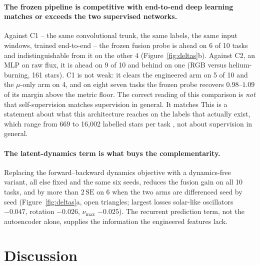 \documentclass{article}
\providecommand{\DIFaddtex}[1]{{\protect\color{blue} \sf #1}} %
\providecommand{\DIFdeltex}[1]{{\protect\color{red} \scriptsize #1}} %
\providecommand{\DIFaddbegin}{} %
\providecommand{\DIFaddend}{} %
\providecommand{\DIFdelbegin}{} %
\providecommand{\DIFdelend}{} %
\providecommand{\DIFadd}[1]{\texorpdfstring{\DIFaddtex{#1}}{#1}} %
\providecommand{\DIFdel}[1]{\texorpdfstring{\DIFdeltex{#1}}{}} %
\providecommand{\DIFscaledelfig}{0.5}
\newlength{\DIFdelgraphicswidth} %
\newlength{\DIFdelgraphicsheight} %
\providecommand{\DIFaddincludegraphics}[2][]{{\color{blue}\fbox{\DIFOincludegraphics[#1]{#2}}}} %
\providecommand{\DIFdelincludegraphics}[2][]{%
\sbox{\DIFdelgraphicsbox}{\DIFOincludegraphics[#1]{#2}}%
\settoboxwidth{\DIFdelgraphicswidth}{\DIFdelgraphicsbox} %
\settoboxtotalheight{\DIFdelgraphicsheight}{\DIFdelgraphicsbox} %
\scalebox{\DIFscaledelfig}{%
\parbox[b]{\DIFdelgraphicswidth}{\usebox{\DIFdelgraphicsbox}\\[-\baselineskip] \rule{\DIFdelgraphicswidth}{0em}}\llap{\resizebox{\DIFdelgraphicswidth}{\DIFdelgraphicsheight}{%
\setlength{\unitlength}{\DIFdelgraphicswidth}%
\begin{picture}(1,1)%
\thicklines\linethickness{2pt} %
{\color[rgb]{1,0,0}\put(0,0){\framebox(1,1){}}}%
{\color[rgb]{1,0,0}\put(0,0){\line( 1,1){1}}}%
{\color[rgb]{1,0,0}\put(0,1){\line(1,-1){1}}}%
\end{picture}%
}\hspace*{3pt}}} %
} %
\DeclareRobustCommand{\DIFaddbegin}{\DIFOaddbegin \let\includegraphics\DIFaddincludegraphics} %
\DeclareRobustCommand{\DIFaddend}{\DIFOaddend \let\includegraphics\DIFOincludegraphics} %
\DeclareRobustCommand{\DIFdelbegin}{\DIFOdelbegin \let\includegraphics\DIFdelincludegraphics} %
\DeclareRobustCommand{\DIFdelend}{\DIFOaddend \let\includegraphics\DIFOincludegraphics} %
\begin{document}
\paragraph{The frozen pipeline \DIFdelbegin \DIFdel{is competitive with end-to-end deep learning}\DIFdelend \DIFaddbegin \DIFadd{matches or exceeds the two supervised networks}\DIFaddend .} Against C1 -- the same
convolutional trunk, the same labels, the same input windows, trained end-to-end -- the frozen fusion
probe is ahead on 6 of 10 tasks and indistinguishable from it on the other 4
(Figure~\ref{fig:deltas}b). Against
C2, an MLP on raw flux, it is ahead on 9 of 10 and behind on one (RGB versus helium-burning, 161
stars). C1 is not weak: it clears the engineered arm on 5 of 10 and the $\mu$-only arm on 4, and on
\DIFdelbegin \DIFdel{eight }\DIFdelend \DIFaddbegin \DIFadd{seven }\DIFaddend tasks the frozen probe recovers $0.98$--$1.09$ of its margin above the metric floor.
\DIFdelbegin \DIFdel{The correct reading of this comparison is \emph{not} that self-supervision matches supervision in general. It matches }\DIFdelend \DIFaddbegin \DIFadd{This is a statement about }\DIFaddend what this architecture reaches on \DIFdelbegin \DIFdel{the labels that actually exist, which range from }\DIFdelend 669 to 16{,}002 labelled stars per task\DIFaddbegin \DIFadd{,
not about supervision in general}\DIFaddend .

\paragraph{The latent-dynamics term is what buys the complementarity.} Replacing the
forward--backward dynamics objective with a dynamics-free variant, all else fixed and the same six
seeds, reduces the fusion gain on all 10 tasks, and by more than $2\,\mathrm{SE}$ on 6 when the two
arms are differenced seed by seed (Figure~\ref{fig:deltas}a, open triangles; largest losses solar-like
oscillators $-0.047$, rotation $-0.026$, $\nu_{\max}$ $-0.025$). The recurrent prediction term, not
the autoencoder alone, supplies the information the engineered features lack.

\section{Discussion}
\end{document}
